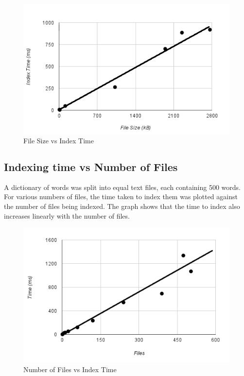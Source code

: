 \documentclass[12pt, a4paper,oneside,twocolumn]{article}
\begin{document}
\begin{figure}[htp]
\centering
\includegraphics[scale=0.45]{sizevstime.png}
\caption{File Size vs Index Time}
\label{}
\end{figure}


\subsection{Indexing time vs Number of Files}

A dictionary of words was split into equal text files, each containing 500 words. For various numbers of files, the time taken to index them was plotted against the number of files being indexed. The graph shows that the time to index also increases linearly with the number of files.
\begin{figure}[htp]
\centering
\includegraphics[scale=0.45]{filesvstime.png}
\caption{Number of Files vs Index Time}
\label{}
\end{figure}
\end{document}
